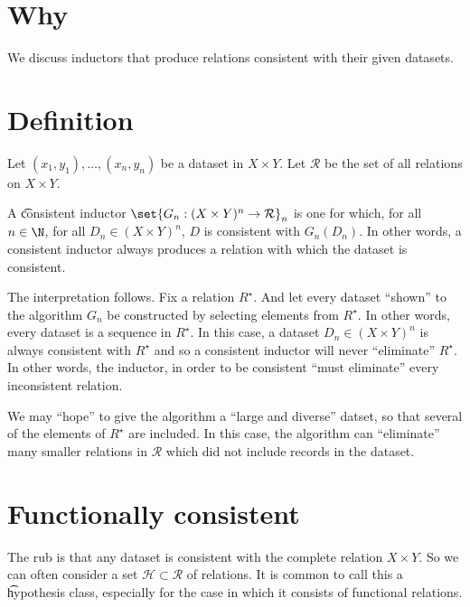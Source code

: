 
\section*{Why}

We discuss inductors that produce relations consistent with their given datasets.

\section*{Definition}

Let $(x_1, y_1), \dots , (x_n, y_n)$ be a dataset in $X \times  Y$.
Let $\mathcal{R} $ be the set of all relations on $X \times Y$.

A \t{consistent inductor} $\set{G_n: (X \times  Y)^n \to \mathcal{R} }_{n}$ is one for which, for all $n \in \N  $, for all $D_n \in (X \times  Y)^n$, $D$ is consistent with $G_n(D_n)$.
In other words, a consistent inductor always produces a relation with which the dataset is consistent.

The interpretation follows.
Fix a relation $R^\star$.
And let every dataset ``shown'' to the algorithm $G_n$ be constructed by selecting elements from $R^{\star}$.
In other words, every dataset is a sequence in $R^\star$.
In this case, a dataset $D_n \in (X \times  Y)^n$ is always consistent with $R^\star$ and so a consistent inductor will never ``eliminate'' $R^{\star}$.
In other words, the inductor, in order to be consistent ``must eliminate'' every inconsistent relation.

We may ``hope'' to give the algorithm a ``large and diverse'' datset, so that several of the elements of $R^\star$ are included.
In this case, the algorithm can ``eliminate'' many smaller relations in $\mathcal{R} $ which did not include records in the dataset.

\section*{Functionally consistent}

The rub is that any dataset is consistent with the complete relation $X \times  Y$.
So we can often consider a set $\mathcal{H}  \subset \mathcal{R} $ of relations.
It is common to call this a \t{hypothesis class}, especially for the case in which it consists of functional relations.
